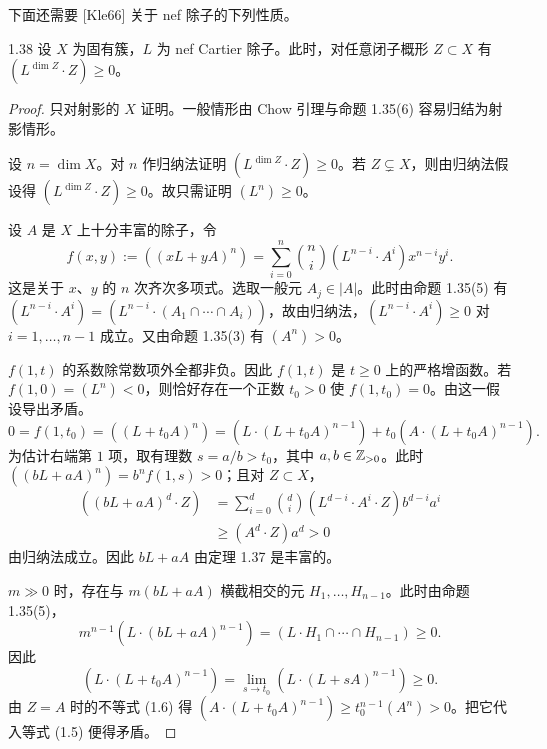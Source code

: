 
下面还需要 [Kle66] 关于 nef 除子的下列性质。

\begin{theoremp}{1.38}
设 $X$ 为固有簇，$L$ 为 nef Cartier 除子。此时，对任意闭子概形 $Z\subset X$ 有 $(L^{\dim Z}\cdot Z)\ge0$。
\end{theoremp}

\begin{proof}
只对射影的 $X$ 证明。一般情形由 Chow 引理与命题 1.35(6) 容易归结为射影情形。

设 $n=\dim X$。对 $n$ 作归纳法证明 $(L^{\dim Z}\cdot Z)\ge0$。若 $Z\subsetneq X$，则由归纳法假设得 $(L^{\dim Z}\cdot Z)\ge0$。故只需证明 $(L^n)\ge0$。

设 $A$ 是 $X$ 上十分丰富的除子，令
\[ f(x,y):=((xL+yA)^n)=\sum_{i=0}^n\binom{n}{i}(L^{n-i}\cdot A^i)x^{n-i}y^i. \]
这是关于 $x$、$y$ 的 $n$ 次齐次多项式。选取一般元 $A_j\in|A|$。此时由命题 1.35(5) 有 $(L^{n-i}\cdot A^i)=(L^{n-i}\cdot(A_1\cap\cdots\cap A_i))$，故由归纳法，$(L^{n-i}\cdot A^i)\ge0$ 对 $i=1,\dots,n-1$ 成立。又由命题 1.35(3) 有 $(A^n)>0$。

$f(1,t)$ 的系数除常数项外全都非负。因此 $f(1,t)$ 是 $t\ge0$ 上的严格增函数。若 $f(1,0)=(L^n)<0$，则恰好存在一个正数 $t_0>0$ 使 $f(1,t_0)=0$。由这一假设导出矛盾。
\begin{equation}\tag{1.5}
0=f(1,t_0)=((L+t_0A)^n)=(L\cdot(L+t_0A)^{n-1})+t_0(A\cdot(L+t_0A)^{n-1}).
\end{equation}
为估计右端第 $1$ 项，取有理数 $s=a/b>t_0$，其中 $a,b\in\mathbb{Z}_{>0}$。此时 $((bL+aA)^n)=b^nf(1,s)>0$；且对 $Z\subset X$，
\begin{equation}\tag{1.6}
\begin{aligned}
((bL+aA)^d\cdot Z)&=\sum_{i=0}^d\binom{d}{i}(L^{d-i}\cdot A^i\cdot Z)b^{d-i}a^i\\
&\ge(A^d\cdot Z)a^d>0
\end{aligned}
\end{equation}
由归纳法成立。因此 $bL+aA$ 由定理 1.37 是丰富的。

$m\gg0$ 时，存在与 $m(bL+aA)$ 横截相交的元 $H_1,\dots,H_{n-1}$。此时由命题 1.35(5)，
\[ m^{n-1}(L\cdot(bL+aA)^{n-1})=(L\cdot H_1\cap\cdots\cap H_{n-1})\ge0. \]
因此
\[ (L\cdot(L+t_0A)^{n-1})=\lim_{s\to t_0}(L\cdot(L+sA)^{n-1})\ge0. \]
由 $Z=A$ 时的不等式 (1.6) 得 $(A\cdot(L+t_0A)^{n-1})\ge t_0^{n-1}(A^n)>0$。把它代入等式 (1.5) 便得矛盾。
\end{proof}

